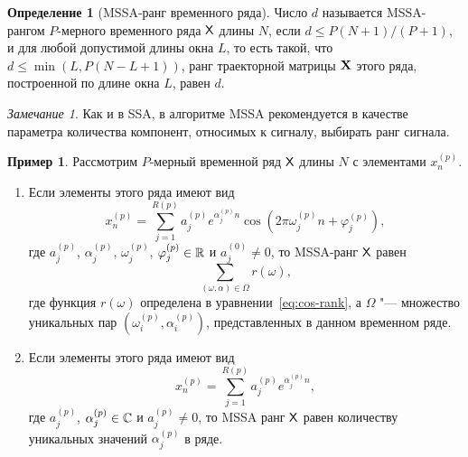 \documentclass[specialist,
  substylefile=spbu_report.rtx,
subf,href,colorlinks=true, 12pt]{disser}
\theoremstyle{plain}
\theoremstyle{definition}
\newtheorem{definition}{Определение}[section]
\newtheorem{example}{Пример}[section]
\theoremstyle{remark}
\newtheorem{remark}{Замечание}[section]
\begin{document}
\begin{definition}[MSSA-ранг временного ряда]
  \label{def:mssa-rank}
  Число $d$ называется MSSA-рангом $P$-мерного временного ряда $\mathsf{X}$
  длины $N$, если $d \leqslant P(N+1) / (P+1)$,
  и для любой допустимой
  длины окна $L$,
  то есть такой, что $d \leqslant \min(L, P(N- L + 1))$, ранг
  траекторной матрицы $\mathbf{X}$ этого ряда,
  построенной по длине окна $L$, равен $d$.
\end{definition}
\begin{remark}
  Как и в SSA, в алгоритме MSSA рекомендуется в качестве параметра
  количества компонент, относимых к сигналу,
  выбирать ранг сигнала.
\end{remark}
\begin{example}
  \label{ex:mssa-ranks}
  Рассмотрим $P$-мерный временной ряд $\mathsf{X}$ длины $N$ с элементами $x_n^{(p)}$.
  \begin{enumerate}
    \item\label{enum:mssa-ranks-real} Если элементы этого ряда имеют вид
      \begin{equation}
        \label{eq:nd-cos-sum-model}
        x_n^{(p)} = \sum_{j=1}^{R(p)} a_j^{(p)} e^{\alpha_j^{(p)} n}
        \cos\left(2 \pi \omega_j^{(p)} n + \varphi_j^{(p)}\right),
      \end{equation}
      где $a_j^{(p)}$, $\alpha_j^{(p)}$, $\omega_j^{(p)}$,
      $\varphi_j^{(p)} \in \mathbb{R}$ и $a_j^{(0)} \ne 0$,
      то MSSA-ранг $\mathsf{X}$ равен
      \begin{equation*}
        \sum_{(\omega, \alpha)\in \Omega} r(\omega),
      \end{equation*}
      где функция $r(\omega)$ определена в уравнении~\eqref{eq:cos-rank},
      а $\Omega$ "--- множество уникальных пар
      \linebreak $\left(\omega_i^{(p)}, \alpha_i^{(p)}\right)$,
      представленных в данном временном ряде.
    \item\label{enum:mssa-ranks-complex} Если элементы этого ряда имеют вид
      \begin{equation}
        \label{eq:nd-complex-sum-model}
        x_n^{(p)} = \sum_{j=1}^{R(p)} a_j^{(p)} e^{\alpha_j^{(p)} n},
      \end{equation}
      где $a_j^{(p)}$, $\alpha_j^{(p)} \in \mathbb{C}$ и $a_j^{(p)} \ne 0$,
      то MSSA ранг $\mathsf{X}$ равен количеству уникальных значений $\alpha_j^{(p)}$
      в ряде.
  \end{enumerate}
\end{example}
\end{document}
